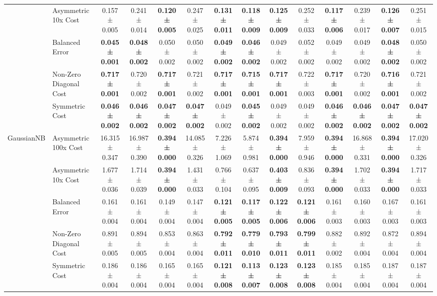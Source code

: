 \begin{table}[H]
{\begin{tabular}{llcccccccccccc}
 & Asymmetric 10x Cost & 0.157 ± 0.005 & 0.241 ± 0.014 & \textbf{0.120 ± 0.005} & 0.247 ± 0.025 & \textbf{0.131 ± 0.011} & \textbf{0.118 ± 0.009} & \textbf{0.125 ± 0.009} & 0.252 ± 0.033 & \textbf{0.117 ± 0.006} & 0.239 ± 0.017 & \textbf{0.126 ± 0.007} & 0.251 ± 0.015 \\
 & Balanced Error & \textbf{0.045 ± 0.001} & \textbf{0.048 ± 0.002} & 0.050 ± 0.002 & 0.050 ± 0.002 & \textbf{0.049 ± 0.002} & \textbf{0.046 ± 0.002} & 0.049 ± 0.002 & 0.052 ± 0.002 & 0.049 ± 0.002 & 0.049 ± 0.002 & \textbf{0.048 ± 0.002} & 0.050 ± 0.002 \\
 & Non-Zero Diagonal Cost & \textbf{0.717 ± 0.001} & 0.720 ± 0.002 & \textbf{0.717 ± 0.001} & 0.721 ± 0.002 & \textbf{0.717 ± 0.001} & \textbf{0.715 ± 0.001} & \textbf{0.717 ± 0.001} & 0.722 ± 0.003 & \textbf{0.717 ± 0.001} & 0.720 ± 0.002 & \textbf{0.716 ± 0.001} & 0.721 ± 0.002 \\
 & Symmetric Cost & \textbf{0.046 ± 0.002} & \textbf{0.046 ± 0.002} & \textbf{0.047 ± 0.002} & \textbf{0.047 ± 0.002} & 0.049 ± 0.002 & \textbf{0.045 ± 0.002} & 0.049 ± 0.002 & 0.049 ± 0.002 & \textbf{0.046 ± 0.002} & \textbf{0.046 ± 0.002} & \textbf{0.047 ± 0.002} & \textbf{0.047 ± 0.002} \\
\cline{1-14}
\multirow[t]{5}{*}{GaussianNB} & Asymmetric 100x Cost & 16.315 ± 0.347 & 16.987 ± 0.390 & \textbf{0.394 ± 0.000} & 14.085 ± 0.326 & 7.226 ± 1.069 & 5.874 ± 0.981 & \textbf{0.394 ± 0.000} & 7.959 ± 0.946 & \textbf{0.394 ± 0.000} & 16.868 ± 0.331 & \textbf{0.394 ± 0.000} & 17.020 ± 0.326 \\
 & Asymmetric 10x Cost & 1.677 ± 0.036 & 1.714 ± 0.039 & \textbf{0.394 ± 0.000} & 1.431 ± 0.033 & 0.766 ± 0.104 & 0.637 ± 0.095 & \textbf{0.403 ± 0.009} & 0.836 ± 0.093 & \textbf{0.394 ± 0.000} & 1.702 ± 0.033 & \textbf{0.394 ± 0.000} & 1.717 ± 0.033 \\
 & Balanced Error & 0.161 ± 0.004 & 0.161 ± 0.004 & 0.149 ± 0.004 & 0.147 ± 0.004 & \textbf{0.121 ± 0.005} & \textbf{0.117 ± 0.005} & \textbf{0.122 ± 0.006} & \textbf{0.121 ± 0.006} & 0.161 ± 0.003 & 0.160 ± 0.003 & 0.167 ± 0.003 & 0.161 ± 0.003 \\
 & Non-Zero Diagonal Cost & 0.891 ± 0.005 & 0.894 ± 0.005 & 0.853 ± 0.004 & 0.863 ± 0.004 & \textbf{0.792 ± 0.011} & \textbf{0.779 ± 0.010} & \textbf{0.793 ± 0.011} & \textbf{0.799 ± 0.011} & 0.882 ± 0.002 & 0.892 ± 0.004 & 0.872 ± 0.004 & 0.894 ± 0.004 \\
 & Symmetric Cost & 0.186 ± 0.004 & 0.186 ± 0.004 & 0.165 ± 0.004 & 0.165 ± 0.004 & \textbf{0.121 ± 0.008} & \textbf{0.113 ± 0.007} & \textbf{0.123 ± 0.008} & \textbf{0.123 ± 0.008} & 0.185 ± 0.004 & 0.185 ± 0.004 & 0.187 ± 0.004 & 0.187 ± 0.004 \\

\end{tabular}}
\end{table}
